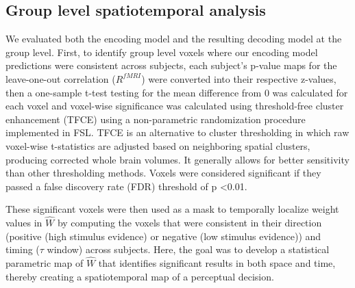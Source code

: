 
\subsection*{Group level spatiotemporal analysis}

We evaluated both the encoding model and the resulting decoding model at the group level.  First, to identify group level voxels where our encoding model predictions were consistent across subjects, each subject's p-value maps for the leave-one-out correlation ($R^{fMRI}$) were converted into their respective z-values, then a one-sample t-test testing for the mean difference from 0 was calculated for each voxel and voxel-wise significance was calculated using threshold-free cluster enhancement (TFCE) using a non-parametric randomization procedure implemented in FSL\cite{Smith2009a}. TFCE is an alternative to cluster thresholding in which raw voxel-wise t-statistics are adjusted based on neighboring spatial clusters, producing corrected whole brain volumes. It generally allows for better sensitivity than other thresholding methods. Voxels were considered significant if they passed a false discovery rate (FDR) threshold of p \textless 0.01. 

These significant voxels were then used as a mask to temporally localize weight values in $\hat{W}$  by computing the voxels that were consistent in their direction (positive (high stimulus evidence) or negative (low stimulus evidence)) and timing ($\tau$ window) across subjects. Here, the goal was to develop a statistical parametric map of $\hat{W}$ that identifies significant results in both space and time, thereby creating a spatiotemporal map of a perceptual decision.

